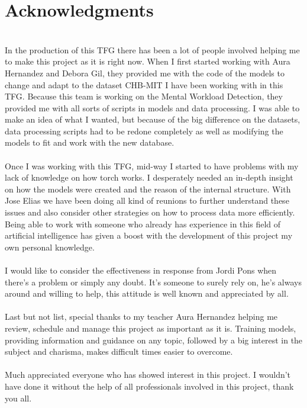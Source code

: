 \section{Acknowledgments}
\leavevmode\\
In the production of this TFG there has been a lot of people involved helping me to make this project as it is right now. When I first started working with Aura Hernandez and Debora Gil, they provided me with the code of the models to change and adapt to the dataset CHB-MIT I have been working with in this TFG. Because this team is working on the Mental Workload Detection, they provided me with all sorts of scripts in models and data processing. I was able to make an idea of what I wanted, but because of the big difference on the datasets, data processing scripts had to be redone completely as well as modifying the models to fit and work with the new database.
\\\\
Once I was working with this TFG, mid-way I started to have problems with my lack of knowledge on how torch works. I desperately needed an in-depth insight on how the models were created and the reason of the internal structure. With Jose Elias we have been doing all kind of reunions to further understand these issues and also consider other strategies on how to process data more efficiently. Being able to work with someone who already has experience in this field of artificial intelligence has given a boost with the development of this project my own personal knowledge.
\\\\
I would like to consider the effectiveness in response from Jordi Pons when there’s a problem or simply any doubt. It’s someone to surely rely on, he’s always around and willing to help, this attitude is well known and appreciated by all.
\\\\
Last but not list, special thanks to my teacher Aura Hernandez helping me review, schedule and manage this project as important as it is. Training models, providing information and guidance on any topic, followed by a big interest in the subject and charisma, makes difficult times easier to overcome.
\\\\
Much appreciated everyone who has showed interest in this project. I wouldn’t have done it without the help of all professionals involved in this project, thank you all.
\\